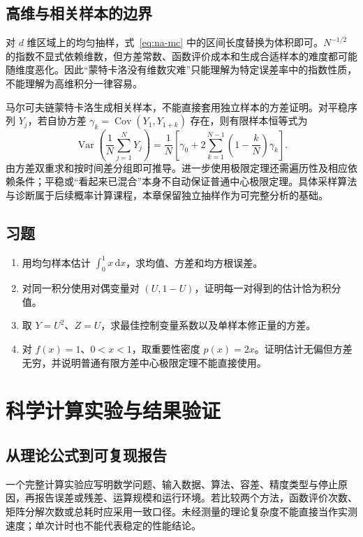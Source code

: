 \documentclass[UTF8,12pt,a4paper,fontset=fandol]{ctexbook}
\begin{document}
\section{高维与相关样本的边界}
对 $d$ 维区域上的均匀抽样，式~\eqref{eq:na-mc} 中的区间长度替换为体积即可。$N^{-1/2}$ 的指数不显式依赖维数，但方差常数、函数评价成本和生成合适样本的难度都可能随维度恶化。因此“蒙特卡洛没有维数灾难”只能理解为特定误差率中的指数性质，不能理解为高维积分一律容易。

马尔可夫链蒙特卡洛生成相关样本，不能直接套用独立样本的方差证明。对平稳序列 $Y_j$，若自协方差 $\gamma_k=\operatorname{Cov}(Y_1,Y_{1+k})$ 存在，则有限样本恒等式为
\[
 \operatorname{Var}\left(\frac1N\sum_{j=1}^NY_j\right)
 =\frac1N\left[\gamma_0+2\sum_{k=1}^{N-1}\left(1-\frac{k}{N}\right)\gamma_k\right].
\]
由方差双重求和按时间差分组即可推导。进一步使用极限定理还需遍历性及相应依赖条件；平稳或“看起来已混合”本身不自动保证普通中心极限定理。具体采样算法与诊断属于后续概率计算课程，本章保留独立抽样作为可完整分析的基础。

\section{习题}
\begin{enumerate}[label=\arabic*.]
\item\label{exr:na-mc-variance} 用均匀样本估计 $\int_0^1x\,\mathrm dx$，求均值、方差和均方根误差。
\item\label{exr:na-mc-antithetic} 对同一积分使用对偶变量对 $(U,1-U)$，证明每一对得到的估计恰为积分值。
\item\label{exr:na-mc-control} 取 $Y=U^2$、$Z=U$，求最佳控制变量系数以及单样本修正量的方差。
\item\label{exr:na-mc-importance} 对 $f(x)=1$、$0<x<1$，取重要性密度 $p(x)=2x$。证明估计无偏但方差无穷，并说明普通有限方差中心极限定理不能直接使用。
\end{enumerate}

\chapter{科学计算实验与结果验证}
\label{chap:na-practice}

\section{从理论公式到可复现报告}
一个完整计算实验应写明数学问题、输入数据、算法、容差、精度类型与停止原因，再报告误差或残差、运算规模和运行环境。若比较两个方法，函数评价次数、矩阵分解次数或总耗时应采用一致口径。未经测量的理论复杂度不能直接当作实测速度；单次计时也不能代表稳定的性能结论。
\end{document}
